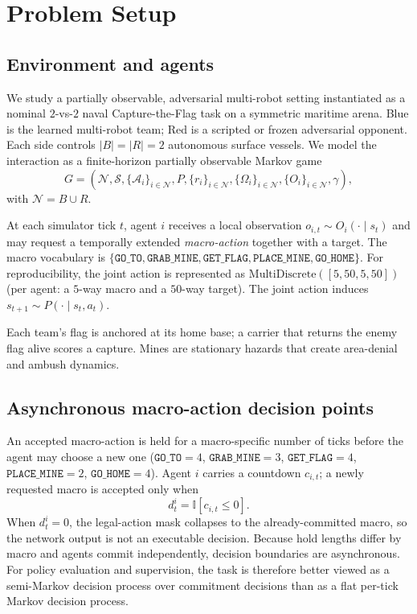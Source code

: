 \documentclass{article}
\begin{document}
\section{Problem Setup}
\label{sec:setup}

\subsection{Environment and agents}

We study a partially observable, adversarial multi-robot setting instantiated
as a nominal $2$-vs-$2$ naval Capture-the-Flag task on a symmetric maritime
arena. Blue is the learned multi-robot team; Red is a scripted or frozen
adversarial opponent. Each side controls $|B|=|R|=2$ autonomous surface vessels.
We model the interaction as a finite-horizon partially observable Markov game
\[
G =
\left(
\mathcal{N},\mathcal{S},\{\mathcal{A}_i\}_{i\in\mathcal{N}},P,
\{r_i\}_{i\in\mathcal{N}},\{\Omega_i\}_{i\in\mathcal{N}},\{O_i\}_{i\in\mathcal{N}},\gamma
\right),
\]
with $\mathcal{N}=B\cup R$.

At each simulator tick $t$, agent $i$ receives a local observation
$o_{i,t}\sim O_i(\cdot\mid s_t)$ and may request a temporally extended
\emph{macro-action} together with a target. The macro vocabulary is
$\{\texttt{GO\_TO},\texttt{GRAB\_MINE},\texttt{GET\_FLAG},\texttt{PLACE\_MINE},\texttt{GO\_HOME}\}$.
For reproducibility, the joint action is represented as
$\mathrm{MultiDiscrete}([5,50,5,50])$ (per agent: a $5$-way macro and a
$50$-way target). The joint action induces $s_{t+1}\sim P(\cdot\mid s_t,a_t)$.

Each team's flag is anchored at its home base; a carrier that returns the enemy
flag alive scores a capture. Mines are stationary hazards that create
area-denial and ambush dynamics.

\subsection{Asynchronous macro-action decision points}

An accepted macro-action is held for a macro-specific number of ticks before the
agent may choose a new one
($\texttt{GO\_TO}=4$, $\texttt{GRAB\_MINE}=3$, $\texttt{GET\_FLAG}=4$,
$\texttt{PLACE\_MINE}=2$, $\texttt{GO\_HOME}=4$). Agent $i$ carries a countdown
$c_{i,t}$; a newly requested macro is accepted only when
\[
d_t^i=\mathbb{I}\!\left[c_{i,t}\le 0\right].
\]
When $d_t^i=0$, the legal-action mask collapses to the already-committed macro,
so the network output is not an executable decision. Because hold lengths differ
by macro and agents commit independently, decision boundaries are asynchronous.
For policy evaluation and supervision, the task is therefore better viewed as a
semi-Markov decision process over commitment decisions than as a flat per-tick
Markov decision process.
\end{document}
